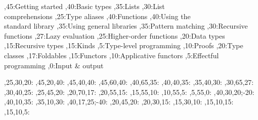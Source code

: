 
\setcounter{diagheight}{50}
\begin{chart}
	,45:{Getting started}
	,40:{Basic types}
	,35:{Lists}
	,30:{List\\comprehensions}
	,25:{Type aliases}
	,40:{Functions}
	,40:{Using the\\standard library}
	,35:{Using general libraries}
	,35:{Pattern matching}
	,30:{Recursive functions}
	,27:{Lazy evaluation}
	,25:{Higher-order functions}
	,20:{Data types}
	,15:{Recursive types}
	,15:{Kinds}
	,5:{Type-level programming}
	,10:{Proofs}
	,20:{Type classes}
	,17:{Foldables}
	,15:{Functors}
	,10:{Applicative functors}
	,5:{Effectful programming}
	,0:{Input \& output}
	
	,25,30,20:
	,45,20,40:
	,45,40,40:
	,45,60,40:
	,40,65,35:
	,40,40,35:
	,35,40,30:
	,30,65,27:
	,30,40,25:
	,25,45,20:
	,20,70,17:
	,20,55,15:
	,15,55,10:
	,10,55,5:
	,5,55,0:
	,40,30,20;-20:
	,40,10,35:
	,35,10,30:
	,40,17,25;-40:
	,20,45,20:
	,20,30,15:
	,15,30,10:
	,15,10,15:
	,15,10,5:
\end{chart}

